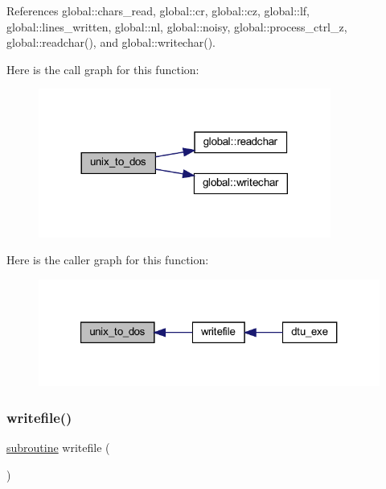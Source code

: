 References global\+::chars\+\_\+read, global\+::cr, global\+::cz, global\+::lf, global\+::lines\+\_\+written, global\+::nl, global\+::noisy, global\+::process\+\_\+ctrl\+\_\+z, global\+::readchar(), and global\+::writechar().

Here is the call graph for this function\+:
\nopagebreak
\begin{figure}[H]
\begin{center}
\leavevmode
\includegraphics[width=272pt]{dtu_8f90_aaa5cd93a63e974bc45e4a6e2d6537ded_cgraph}
\end{center}
\end{figure}
Here is the caller graph for this function\+:
\nopagebreak
\begin{figure}[H]
\begin{center}
\leavevmode
\includegraphics[width=321pt]{dtu_8f90_aaa5cd93a63e974bc45e4a6e2d6537ded_icgraph}
\end{center}
\end{figure}
\mbox{\label{dtu_8f90_a6431a93cf13a3651f17078298d2d2ef9}} 
\subsubsection{\texorpdfstring{writefile()}{writefile()}}
{\footnotesize\ttfamily \hyperlink{M__stopwatch_83_8txt_acfbcff50169d691ff02d4a123ed70482}{subroutine} writefile (\begin{DoxyParamCaption}{ }\end{DoxyParamCaption})}



